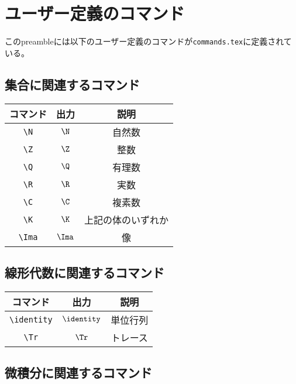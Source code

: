 \chapter{ユーザー定義のコマンド}

このpreambleには以下のユーザー定義のコマンドが\verb|commands.tex|に定義されている。

\section{集合に関連するコマンド}

\begin{longtable}{ccc}
    \toprule
    コマンド    & 出力     & 説明               \\
    \midrule
    \verb|\N|   & \(\N\)   & 自然数             \\
    \verb|\Z|   & \(\Z\)   & 整数               \\
    \verb|\Q|   & \(\Q\)   & 有理数             \\
    \verb|\R|   & \(\R\)   & 実数               \\
    \verb|\C|   & \(\C\)   & 複素数             \\
    \verb|\K|   & \(\K\)   & 上記の体のいずれか \\
    \verb|\Ima| & \(\Ima\) & 像                 \\
    \bottomrule
\end{longtable}

\section{線形代数に関連するコマンド}

\begin{longtable}{ccc}
    \toprule
    コマンド         & 出力          & 説明     \\
    \midrule
    \verb|\identity| & \(\identity\) & 単位行列 \\
    \verb|\Tr|       & \(\Tr\)       & トレース \\
    \bottomrule
\end{longtable}

\section{微積分に関連するコマンド}

